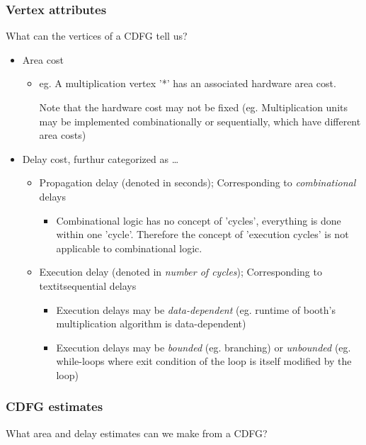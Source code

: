 \documentclass{article}
\begin{document}
\subsubsection{Vertex attributes}
What can the vertices of a CDFG tell us?
\begin{itemize}
    \item Area cost
        \begin{itemize}
            \item eg. A multiplication vertex '*' has an associated hardware area cost.
                   
                  Note that the hardware cost may not be fixed (eg. Multiplication units may be implemented combinationally or sequentially, which have different area costs)
        \end{itemize}
    \item Delay cost, furthur categorized as \dots
        \begin{itemize}
            \item Propagation delay (denoted in seconds); Corresponding to \textit{combinational} delays
             \begin{itemize}
                \item Combinational logic has no concept of 'cycles', everything is done within one 'cycle'. 
                      Therefore the concept of 'execution cycles' is not applicable to combinational logic.
             \end{itemize}
            \item Execution delay (denoted in \textit{number of cycles}); Corresponding to textit{sequential} delays
             \begin{itemize}
                \item Execution delays may be \textit{data-dependent} (eg. runtime of booth's multiplication algorithm is data-dependent)
                \item Execution delays may be \textit{bounded} (eg. branching) or \textit{unbounded} (eg. while-loops where exit condition of the loop is itself modified by the loop)
             \end{itemize}
        \end{itemize}
\end{itemize}

\subsubsection{CDFG estimates}
What area and delay estimates can we make from a CDFG?
\end{document}

